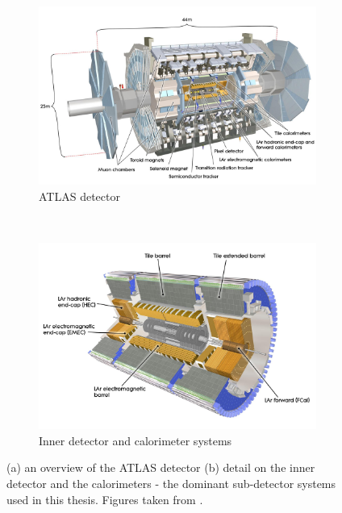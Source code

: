 \begin{figure}[p]
  \centering
  \begin{subfigure}[b]{0.9\textwidth}
    \includegraphics[width=\textwidth]{Chapter2/ATLAS.png}
    \caption{ATLAS detector}
    \label{fig:ATLASfull}
  \end{subfigure}
  ~
  \begin{subfigure}[b]{0.9\textwidth}
    \includegraphics[width=\textwidth]{Chapter2/ATLASinner.jpeg}
    \caption{Inner detector and calorimeter systems}
    \label{fig:ATLASinner}
  \end{subfigure}
  \caption{(a) an overview of the ATLAS detector 
           (b) detail on the inner detector and the calorimeters - the dominant
           sub-detector systems used in this thesis. Figures taken from
           \cite{CERNbook}.}
  \label{fig:ATLAS}
\end{figure}

